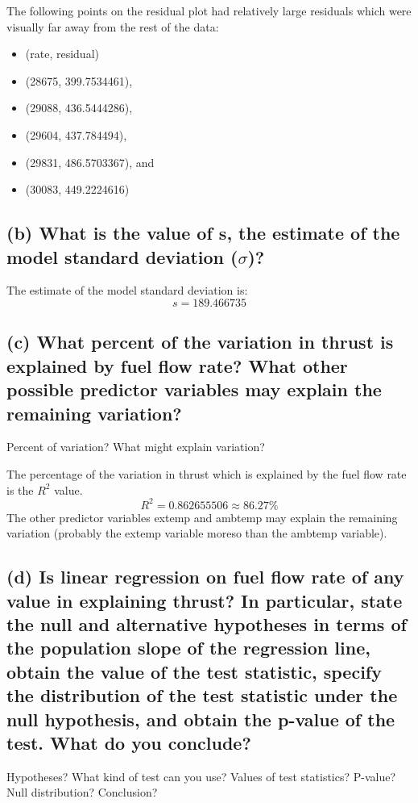 \documentclass[letterpaper]{article}
\begin{document}
The following points on the residual plot had relatively large residuals which were
visually far away from the rest of the data:
\begin{itemize}
 \item[] (rate, residual)
 \item[] (28675, 399.7534461),
 \item[] (29088, 436.5444286),
 \item[] (29604, 437.784494),
 \item[] (29831, 486.5703367), and
 \item[] (30083, 449.2224616)
\end{itemize}

\subsection{(b)	What is the value of s, the estimate of the model standard deviation ($\sigma$)?}
The estimate of the model standard deviation is:
$$s = 189.466735$$

\subsection{(c)	What percent of the variation in  thrust is explained by fuel flow rate? What other possible predictor variables may explain the remaining variation?}
Percent of variation? What might explain variation?

The percentage of the variation in thrust which is explained by the fuel flow rate
is the $R^2$ value.
$$R^2 = 0.862655506 \approx 86.27\%$$
The other predictor variables extemp and ambtemp may explain the remaining variation
(probably the extemp variable moreso than the ambtemp variable).

\subsection{(d)	Is linear regression on fuel flow rate of any value in explaining thrust? In particular, state the
 null and alternative hypotheses in terms of the population slope of the regression line, obtain the value of the test statistic, specify the distribution of the test statistic under the null hypothesis, and obtain the p-value of the test. What do you conclude?}
Hypotheses? What kind of test can you use? Values of test
statistics? P-value? Null distribution? Conclusion?
\end{document}
